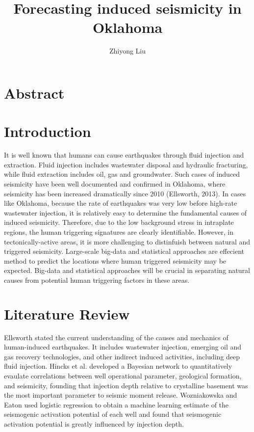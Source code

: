 \documentclass[project-plan]{report-template}
\title{Forecasting induced seismicity in Oklahoma}
\author{Zhiyong Liu}
\begin{document}
\maketitlepage  %
\githubrepo  %

\section*{Abstract}

\section{Introduction}
It is well known that humans can cause earthquakes through fluid injection and extraction.
Fluid injection includes wastewater disposal and hydraulic fracturing, while fluid extraction includes oil, gas and groundwater.
Such cases of induced seismicity have been well documented and confirmed in Oklahoma, where seismicity has been increased dramatically since 2010 (Ellsworth, 2013).
In cases like Oklahoma, because the rate of earthquakes was very low before high-rate wastewater injection, it is relatively easy to determine the fundamental causes of induced seismicity.
Therefore, due to the low background stress in intraplate regions, the human triggering signatures are clearly identifiable.
However, in tectonically-active areas, it is more challenging to distinfuish between natural and triggered seismicity.
Large-scale big-data and statistical approaches are effecient method to predict the locations where human triggered seismicity may be expected.
Big-data and statistical approaches will be crucial in separating natural causes from potential human triggering factors in these areas.

\section{Literature Review}
Ellsworth \citep{ellsworth2013injection} stated the current understanding of the causes and mechanics of human-induced earthquakes. It includes wastewater injection, emerging oil and gas recovery technologies, and other indirect induced activities,
including deep fluid injection.
Hincks et al. \citep{hincks2018oklahoma} developed a Bayesian network to quantitatively evaulate correlations between well operational parameter, geological formation, and seismicity,
founding that injection depth relative to crystalline basement was the most important parameter to seismic moment release.
Wozniakowska and Eaton \citep{wozniakowska2020machine} used logistic regression to obtain a machine learning estimate of the seismogenic activation potential of each well and found that seismogenic activation potential is greatly influenced by injection depth.
\end{document}
